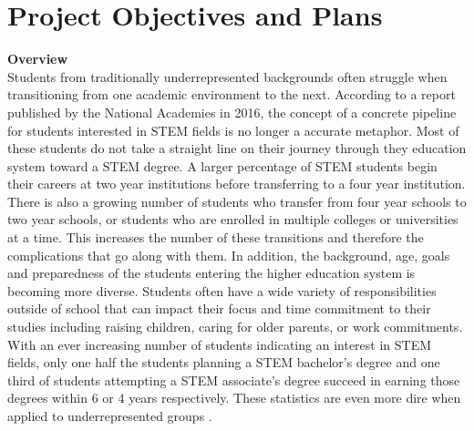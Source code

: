 \documentclass[12pt]{article}
\begin{document}
\section{Project Objectives and Plans}

\noindent
{\bf Overview}\\
Students from traditionally underrepresented backgrounds often struggle when transitioning from one academic environment to the next.  According to a report published by the National Academies in 2016, the concept of a concrete pipeline for students interested in STEM fields is no longer a accurate metaphor.  Most of these students do not take a straight line on their journey through they education system toward a STEM degree.  A larger percentage of STEM students begin their careers at two year institutions before transferring to a four year institution.  There is also a growing number of students who transfer from four year schools to two year schools, or students who are enrolled in multiple colleges or universities at a time. This increases the number of these transitions and therefore the complications that go along with them. 
In addition, the background, age, goals and preparedness of the students entering the higher education system is becoming more diverse. Students often have a wide variety of responsibilities outside of school that can impact their focus and time commitment to their studies including raising children, caring for older parents, or work commitments.  With an ever increasing number of students indicating an interest in STEM fields, only one half the students planning a STEM bachelor's degree and one third of students attempting a STEM associate's degree succeed in earning those degrees within 6 or 4 years respectively.  These statistics are even more dire when applied to underrepresented groups \citep{NAP21739}. %
\end{document}
